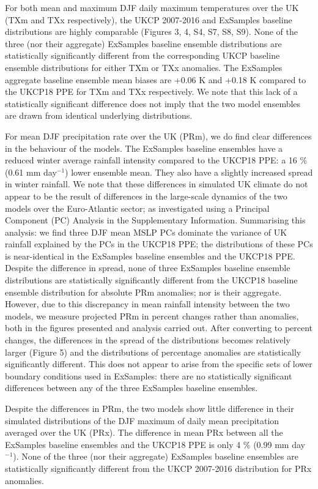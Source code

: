    For both mean and maximum DJF daily maximum temperatures over the UK (TXm and TXx respectively), the UKCP 2007-2016 and ExSamples baseline distributions are highly comparable (Figures 3, 4, S4, S7, S8, S9). None of the three (nor their aggregate) ExSamples baseline ensemble distributions are statistically significantly different from the corresponding UKCP baseline ensemble distributions for either TXm or TXx anomalies. The ExSamples aggregate baseline ensemble mean biases are +0.06 K and +0.18 K compared to the UKCP18 PPE for TXm and TXx respectively. We note that this lack of a statistically significant difference does not imply that the two model ensembles are drawn from identical underlying distributions.
    
    For mean DJF precipitation rate over the UK (PRm), we do find clear differences in the behaviour of the models. The ExSamples baseline ensembles have a reduced winter average rainfall intensity compared to the UKCP18 PPE: a 16 \% (0.61 mm day$^{-1}$) lower ensemble mean. They also have a slightly increased spread in winter rainfall. We note that these differences in simulated UK climate do not appear to be the result of differences in the large-scale dynamics of the two models over the Euro-Atlantic sector; as investigated using a Principal Component (PC) Analysis in the Supplementary Information. Summarising this analysis: we find three DJF mean MSLP PCs dominate the variance of UK rainfall explained by the PCs in the UKCP18 PPE; the distributions of these PCs is near-identical in the ExSamples baseline ensembles and the UKCP18 PPE. Despite the difference in spread, none of three ExSamples baseline ensemble distributions are statistically significantly different from the UKCP18 baseline ensemble distribution for absolute PRm anomalies; nor is their aggregate. However, due to this discrepancy in mean rainfall intensity between the two models, we measure projected PRm in percent changes rather than anomalies, both in the figures presented and analysis carried out. After converting to percent changes, the differences in the spread of the distributions becomes relatively larger (Figure 5) and the distributions of percentage anomalies are statistically significantly different. This does not appear to arise from the specific sets of lower boundary conditions used in ExSamples: there are no statistically significant differences between any of the three ExSamples baseline ensembles.
     
    Despite the differences in PRm, the two models show little difference in their simulated distributions of the DJF maximum of daily mean precipitation averaged over the UK (PRx). The difference in mean PRx between all the ExSamples baseline ensembles and the UKCP18 PPE is only 4 \% (0.99 mm day$^{-1}$). None of the three (nor their aggregate) ExSamples baseline ensembles are statistically significantly different from the UKCP 2007-2016 distribution for PRx anomalies.

